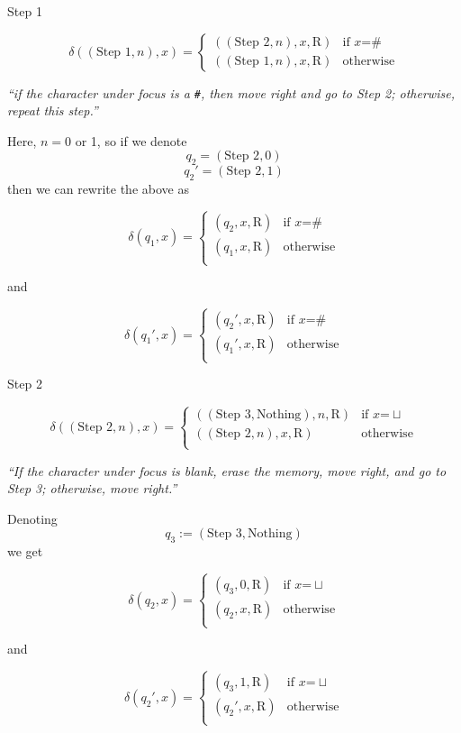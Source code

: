\documentclass[
  ignorenonframetext,
]{beamer}
\begin{document}
\begin{frame}[fragile]{Step 1}
\protect\hypertarget{step-1}{}

\[\delta((\text{Step 1}, n), x) = \begin{cases}
((\text{Step 2}, n) ,x, \mathrm{R}) & \text{if } x \text{=} \#\\
((\text{Step 1}, n),x, \mathrm{R}) & \text{otherwise}
\end{cases}
\]

\emph{``if the character under focus is a \texttt{\#}, then move right and go to Step 2; otherwise, repeat this step.''}

Here, \(n=0\) or 1, so if we denote \[q_2=(\text{Step 2},0)\]
\[q_2'=(\text{Step 2},1)\] then we can rewrite the above as

\[\delta(q_1, x) = \begin{cases}
(q_2 ,x, \mathrm{R}) & \text{if } x \text{=} \#\\
(q_1,x, \mathrm{R}) & \text{otherwise}\\
\end{cases}
\]

and

\[\delta(q_1', x) = \begin{cases}
(q_2' ,x, \mathrm{R}) & \text{if } x \text{=} \#\\
(q_1',x, \mathrm{R}) & \text{otherwise}\\
\end{cases}
\]

\end{frame}

\begin{frame}{Step 2}
\protect\hypertarget{step-2}{}

\[\delta((\text{Step 2},n), x) = \begin{cases}
((\text{Step 3},\text{Nothing}),n, \mathrm{R}) & \text{if } x \text{=} \sqcup\\
((\text{Step 2},n),x, \mathrm{R}) & \text{otherwise}\\
\end{cases}
\]

\emph{``If the character under focus is blank, erase the memory, move
right, and go to Step 3; otherwise, move right.''}

Denoting \[q_3:=(\text{Step 3},\text{Nothing})\] we get

\[\delta(q_2, x) = \begin{cases}
(q_3,0, \mathrm{R}) & \text{if } x \text{=} \sqcup\\
(q_2,x, \mathrm{R}) & \text{otherwise}\\
\end{cases}
\]

and

\[\delta(q_2', x) = \begin{cases}
(q_3,1, \mathrm{R}) & \text{if } x \text{=} \sqcup \\
(q_2',x, \mathrm{R}) & \text{otherwise}\\
\end{cases}
\]

\end{frame}
\end{document}
